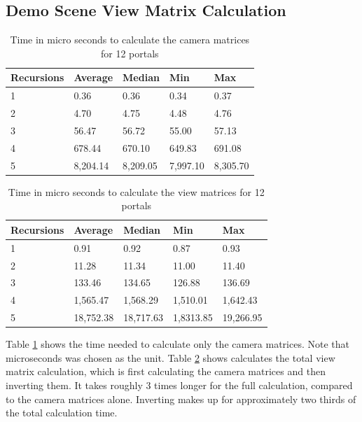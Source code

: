 \subsection{Demo Scene View Matrix Calculation}
\label{section:perfmatrixcalc}

\begin{table}[H]
	\centering
	\begin{tabular}{|l|l|l|l|l|}
		\hline
		Recursions & Average & Median  & Min     & Max     \\ \hline
		1          & 0.36    & 0.36    & 0.34    & 0.37    \\ \hline
		2          & 4.70    & 4.75    & 4.48    & 4.76    \\ \hline
		3          & 56.47   & 56.72   & 55.00   & 57.13   \\ \hline
		4          & 678.44  & 670.10  & 649.83  & 691.08  \\ \hline
		5          & 8,204.14 & 8,209.05 & 7,997.10 & 8,305.70\\ \hline
	\end{tabular}
	\caption{Time in micro seconds to calculate the camera matrices for 12 portals}
	\label{tab:cameramatricecalc}
\end{table}

\begin{table}[H]
	\centering
	\begin{tabular}{|l|l|l|l|l|}
		\hline
		Recursions & Average   & Median  	& Min     	& Max        \\ \hline
		1          & 0.91      & 0.92		& 0.87    	& 0.93       \\ \hline
		2          & 11.28     & 11.34		& 11.00    	& 11.40      \\ \hline
		3          & 133.46    & 134.65		& 126.88   	& 136.69     \\ \hline
		4          & 1,565.47  & 1,568.29	& 1,510.01  & 1,642.43   \\ \hline
		5          & 18,752.38 & 18,717.63	& 1,8313.85 & 19,266.95 \\ \hline
	\end{tabular}
	\caption{Time in micro seconds to calculate the view matrices for 12 portals}
	\label{tab:cameramatricecalcinverse}
\end{table}

Table \ref{tab:cameramatricecalc} shows the time needed to calculate only the camera matrices. Note that microseconds was chosen as the unit. Table \ref{tab:cameramatricecalcinverse} shows calculates the total view matrix calculation, which is first calculating the camera matrices and then inverting them. It takes roughly 3 times longer for the full calculation, compared to the camera matrices alone. Inverting makes up for approximately two thirds of the total calculation time.

